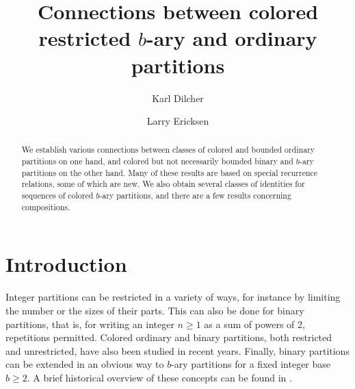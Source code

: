 \documentclass{amsart}
\theoremstyle{plain}
\numberwithin{equation}{section}
\begin{document}
\title[Connections between partitions]{Connections between colored restricted 
$b$-ary and ordinary partitions}

\author{Karl Dilcher}
\address{Department of Mathematics and Statistics\\
         Dalhousie University\\
         Halifax, Nova Scotia, B3H 4R2, Canada}
%
\author{Larry Ericksen}
\address{1212 Forest Drive, Millville, NJ 08332-2512, USA}

\date{}

\setcounter{equation}{0}

\begin{abstract}
We establish various connections between classes of colored and bounded 
ordinary partitions on one hand, and colored but not necessarily bounded 
binary and $b$-ary partitions on the other hand. Many of these results are 
based on special recurrence relations, some of which are new. We also obtain
several classes of identities for sequences of colored $b$-ary partitions,
and there are a few results concerning compositions.
\end{abstract}

\maketitle

\section{Introduction}\label{sec:1}

Integer partitions can be restricted in a variety of ways, for instance by
limiting the number or the sizes of their parts. This can also be done for
binary partitions, that is, for writing an integer $n\geq 1$ as a sum of
powers of 2, repetitions permitted. Colored ordinary and binary partitions,
both restricted and unrestricted, have also been studied in recent years.
Finally, binary partitions can be extended in an obvious way to $b$-ary
partitions for a fixed integer base $b\geq 2$. A brief historical overview
of these concepts can be found in \cite{DE10}.
\end{document}
